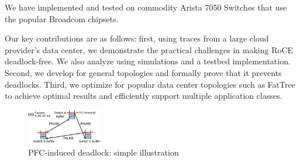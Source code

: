 We have implemented and tested \sysname{} on commodity Arista 7050 Switches that
use the popular Broadcom chipsets.

Our key contributions are as follows: first, using traces from a large cloud
provider's data center, we demonstrate the practical challenges in making RoCE
deadlock-free. We also analyze \sysname{} using simulations and a testbed
implementation. Second, we develop \sysname{} for general topologies and
formally prove that it prevents deadlocks. Third, we optimize \sysname{} for
popular data center topologies such as FatTree to achieve optimal results and
efficiently support multiple application classes.  

\begin{figure}
	\centering
	\includegraphics[width=0.3\textwidth] {figs/deadlock}
	\vspace{-0.15in}
	\caption{PFC-induced deadlock: simple illustration}
	\vspace{-0.25in}
	\label{fig:deadlock_example}
\end{figure}
